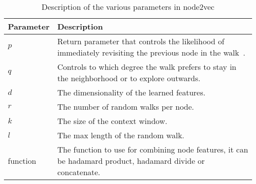 
\begin{table}[tbp]
\centering
\begin{tabular}{@{}p{}p{}@{}}
\toprule
\textbf{Parameter} & \textbf{Description} \\
\midrule
$p$          &   Return parameter that controls the likelihood of immediately revisiting the previous node in the walk~\cite{node2vec}.   \\
$q$          &   Controls to which degree the walk prefers to stay in the neighborhood or to explore outwards.   \\
$d$          &   The dimensionality of the learned features.   \\
$r$          &   The number of random walks per node.   \\
$k$          &   The size of the context window.   \\
$l$          &   The max length of the random walk.   \\
function     &   The function to use for combining node features, it can be hadamard product, hadamard divide or concatenate.   \\
\bottomrule
\end{tabular}
\caption[Description of parameters in node2vec]{Description of the various parameters in node2vec}%
\label{tab:node2vecparams}
\end{table}




